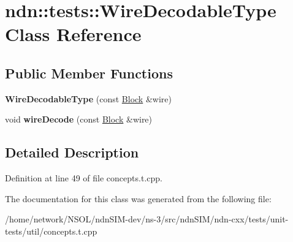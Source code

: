 \hypertarget{classndn_1_1tests_1_1WireDecodableType}{}\section{ndn\+:\+:tests\+:\+:Wire\+Decodable\+Type Class Reference}
\label{classndn_1_1tests_1_1WireDecodableType}
\subsection*{Public Member Functions}
\begin{DoxyCompactItemize}
\item 
{\bfseries Wire\+Decodable\+Type} (const \hyperlink{classndn_1_1Block}{Block} \&wire)\hypertarget{classndn_1_1tests_1_1WireDecodableType_a184736d4a9f48194e0cae1c99ba1e4b7}{}\label{classndn_1_1tests_1_1WireDecodableType_a184736d4a9f48194e0cae1c99ba1e4b7}

\item 
void {\bfseries wire\+Decode} (const \hyperlink{classndn_1_1Block}{Block} \&wire)\hypertarget{classndn_1_1tests_1_1WireDecodableType_a3a0c7ef00fbbea5e302b9bcad5451e69}{}\label{classndn_1_1tests_1_1WireDecodableType_a3a0c7ef00fbbea5e302b9bcad5451e69}

\end{DoxyCompactItemize}


\subsection{Detailed Description}


Definition at line 49 of file concepts.\+t.\+cpp.



The documentation for this class was generated from the following file\+:\begin{DoxyCompactItemize}
\item 
/home/network/\+N\+S\+O\+L/ndn\+S\+I\+M-\/dev/ns-\/3/src/ndn\+S\+I\+M/ndn-\/cxx/tests/unit-\/tests/util/concepts.\+t.\+cpp\end{DoxyCompactItemize}
